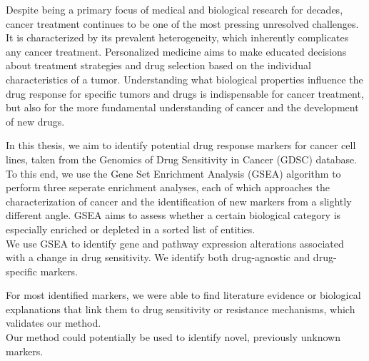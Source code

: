 Despite being a primary focus of medical and biological research for decades, cancer treatment continues to be one of the most pressing unresolved challenges.
It is characterized by its prevalent heterogeneity, which inherently complicates any cancer treatment. Personalized medicine aims to make educated decisions about treatment strategies and drug selection based on the individual characteristics of a tumor. Understanding what biological properties influence the drug response for specific tumors and drugs is indispensable for cancer treatment, but also for the more fundamental understanding of cancer and the development of new drugs.

In this thesis, we aim to identify potential drug response markers for cancer cell lines, taken from the Genomics of Drug Sensitivity in Cancer (GDSC) database. To this end, we use the Gene Set Enrichment Analysis (GSEA) algorithm to perform three seperate enrichment analyses, each of which approaches the characterization of cancer and the identification of new markers from a slightly different angle. GSEA aims to assess whether a certain biological category is especially enriched or depleted in a sorted list of entities.\\
We use GSEA to identify gene and pathway expression alterations associated with a change in drug sensitivity. We identify both drug-agnostic and drug-specific markers.

For most identified markers, we were able to find literature evidence or biological explanations that link them to drug sensitivity or resistance mechanisms, which validates our method.\\
Our method could potentially be used to identify novel, previously unknown markers.